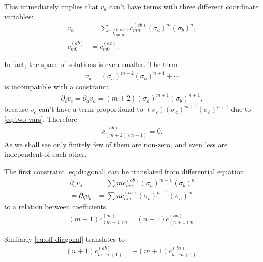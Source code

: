\documentclass[aps,prd,final,twocolumn,floats,floatfix,nofootinbib,10pt]{revtex4-1}
\begin{document}
This immediately implies that $v_a$ can't have terms with three different
coordinate variables:
\begin{align}
  v_a & = \sum_{\overset{m \geq 0, n \geq 0}{b \neq a}}
  c^{(ab)}_{mn} (\sigma_a)^m (\sigma_b)^n, \\
  c^{(ab)}_{m0} & = c^{(ac)}_{m0}.
\end{align}

In fact, the space of solutions is even smaller. The term
\begin{align}
  v_a = (\sigma_a)^{m + 2} (\sigma_b)^{n + 1} + \cdots
\end{align}
is incompatible with a constraint:
\begin{align}
  \partial_c v_c = \partial_a v_a =
    (m + 2) (\sigma_a)^{m + 1} (\sigma_b)^{n + 1},
\end{align}
because $v_c$ can't have a term proportional to
$(\sigma_c) (\sigma_a)^{m + 1} (\sigma_b)^{n + 1}$ due to \eqref{eq:two-vars}.
Therefore
\begin{align} \label{eq:corner}
  c^{(ab)}_{(m + 2)(n + 1)} = 0.
\end{align}
As we shall see only finitely few of them are non-zero, and even less
are independent of each other.

The first constraint \eqref{eq:diagonal} can be translated from differential
equation
\begin{align}
  \partial_a v_a & = \sum m c^{(ab)}_{mn} (\sigma_a)^{m - 1} (\sigma_b)^n \\
  = \partial_b v_b & = \sum n c^{(ba)}_{nm} (\sigma_b)^{n - 1} (\sigma_a)^m
\end{align}
to a relation between coefficients
\begin{align} \label{eq:first-rel}
  (m + 1) c^{(ab)}_{(m + 1) n} = (n+1) c^{(ba)}_{(n + 1) m}.
\end{align}

Similarly \eqref{eq:off-diagonal} translates to
\begin{align} \label{eq:second-rel}
  (n + 1) c^{(ab)}_{m (n + 1)} = -(m + 1) c^{(ba)}_{n (m + 1)}.
\end{align}
\end{document}
